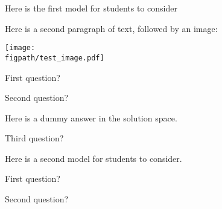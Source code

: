 \begin{activity}
\begin{instructornotes}
\end{instructornotes}

\begin{model}[ABC]

	Here is the first model for students to consider

	Here is a second paragraph of text, followed by an image:

	\centerline{\texttt{[image: \\figpath/test\_image.pdf]}}

\end{model}


\begin{ctqs}

	\question First question?
	
		\begin{solution}[1in]
		\end{solution}
		
	\question Second question?
	
		\begin{solution}[1in]
			Here is a dummy answer in the solution space.
		\end{solution}
		
	\question Third question?
	
		\begin{solution}[1in]
		
			
			
		\end{solution}

\end{ctqs}



\begin{model}[DEF]

	Here is a second model for students to consider.

\end{model}

\begin{ctqs}

	\question First question?
	
		\begin{solution}
		\end{solution}
	
	\question Second question?
	

\end{ctqs}
\end{activity}
